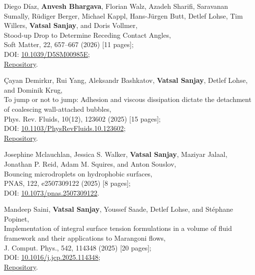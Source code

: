 	\item Diego Díaz, \textbf{Anvesh Bhargava}, Florian Walz, Azadeh Sharifi, Saravanan Sumally, Rüdiger Berger, Michael Kappl, Hans-Jürgen Butt, Detlef Lohse, Tim Willers, \textbf{Vatsal Sanjay}, and Doris Vollmer,\\
	Stood-up Drop to Determine Receding Contact Angles,\\
	Soft Matter, 22, 657--667 (2026) [11 pages];\\
	\faFile\hspace{0.2em}DOI: \href{https://doi.org/10.1039/D5SM00985E}{10.1039/D5SM00985E};\\
	\faGithub\hspace{0.2em}\href{https://github.com/comphy-lab/Retracting-Droplet}{Repository}.

	\item Çayan Demirkır, Rui Yang, Aleksandr Bashkatov, \textbf{Vatsal Sanjay}, Detlef Lohse, and Dominik Krug,\\
	To jump or not to jump: Adhesion and viscous dissipation dictate the detachment of coalescing wall-attached bubbles,\\
	Phys. Rev. Fluids, 10(12), 123602 (2025) [15 pages];\\
	\faFile\hspace{0.2em}DOI: \href{https://doi.org/10.1103/PhysRevFluids.10.123602}{10.1103/PhysRevFluids.10.123602};\\
	\faGithub\hspace{0.2em}\href{https://github.com/VatsalSy/jumping-bubbles}{Repository}.

	\item Josephine Mclauchlan, Jessica S. Walker, \textbf{Vatsal Sanjay}, Maziyar Jalaal, Jonathan P. Reid, Adam M. Squires, and Anton Souslov,\\
	Bouncing microdroplets on hydrophobic surfaces,\\
	PNAS, 122, e2507309122 (2025) [8 pages];\\
	\faFile\hspace{0.2em}DOI: \href{https://doi.org/10.1073/pnas.2507309122}{10.1073/pnas.2507309122}.

	\item Mandeep Saini, \textbf{Vatsal Sanjay}, Youssef Saade, Detlef Lohse, and Stéphane Popinet,\\
	Implementation of integral surface tension formulations in a volume of fluid framework and their applications to Marangoni flows,\\
	J. Comput. Phys., 542, 114348 (2025) [20 pages];\\
	\faFile\hspace{0.2em}DOI: \href{https://doi.org/10.1016/j.jcp.2025.114348}{10.1016/j.jcp.2025.114348};\\
	\faGithub\hspace{0.2em}\href{https://github.com/comphy-lab/marangoniSheet}{Repository}.

